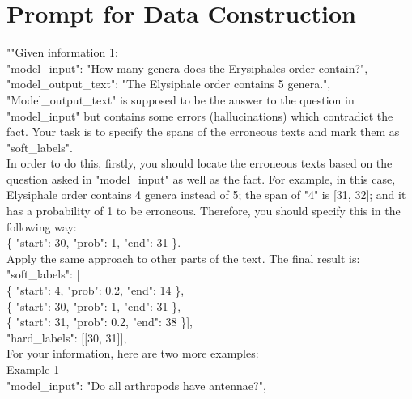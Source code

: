 \documentclass[11pt]{article}
\begin{document}
\section{Prompt for Data Construction}
\label{sec:appendix}
\small
\ttfamily
""Given information 1:\\
\hspace*{1em} "model\_input": "How many genera does the Erysiphales order contain?",\\
\hspace*{1em} "model\_output\_text": "The Elysiphale order contains 5 genera.",\\
\hspace*{1em} "Model\_output\_text" is supposed to be the answer to the question in "model\_input" but contains some errors (hallucinations) which contradict the fact. Your task is to specify the spans of the erroneous texts and mark them as "soft\_labels".\\
\hspace*{1em} In order to do this, firstly, you should locate the erroneous texts based on the question asked in "model\_input" as well as the fact. For example, in this case, Elysiphale order contains 4 genera instead of 5; the span of "4" is [31, 32]; and it has a probability of 1 to be erroneous. Therefore, you should specify this in the following way:\\
\hspace*{2em} \{ "start": 30, "prob": 1, "end": 31 \}.\\
\hspace*{1em} Apply the same approach to other parts of the text. The final result is:\\
\hspace*{2em} "soft\_labels": [\\
\hspace*{3em} \{ "start": 4, "prob": 0.2, "end": 14 \},\\
\hspace*{3em} \{ "start": 30, "prob": 1, "end": 31 \},\\
\hspace*{3em} \{ "start": 31, "prob": 0.2, "end": 38 \}],\\
\hspace*{2em} "hard\_labels": [[30, 31]],\\
For your information, here are two more examples:\\
Example 1\\
\hspace*{1em} "model\_input": "Do all arthropods have antennae?",\\
\end{document}

